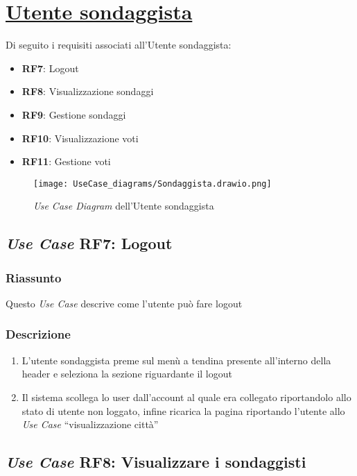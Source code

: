 \section{\underline{Utente sondaggista}}
    Di seguito i requisiti associati all'Utente sondaggista:
    \begin{itemize}
        \item \textbf{RF7}: Logout
        \item \textbf{RF8}: Visualizzazione sondaggi
        \item \textbf{RF9}: Gestione sondaggi
        \item \textbf{RF10}: Visualizzazione voti
        \item \textbf{RF11}: Gestione voti
    \end{itemize}
    \begin{figure}[H]
        \centering
        \texttt{[image: UseCase\_diagrams/Sondaggista.drawio.png]}
        \caption{\textit{Use Case Diagram} dell'Utente sondaggista}
    \end{figure}

    \subsection{\textit{Use Case} RF7: Logout}
        \subsubsection{Riassunto}
            Questo \textit{Use Case} descrive come l'utente può fare logout
        \subsubsection{Descrizione}
            \begin{enumerate}
                \item L'utente sondaggista preme sul menù a tendina presente all'interno della header e seleziona la sezione riguardante il logout
                \item Il sistema scollega lo user dall'account al quale era collegato riportandolo allo stato di utente non loggato, infine 
                ricarica la pagina riportando l'utente allo \textit{Use Case} ``visualizzazione città''
            \end{enumerate}

    \subsection{\textit{Use Case} RF8: Visualizzare i sondaggisti}
